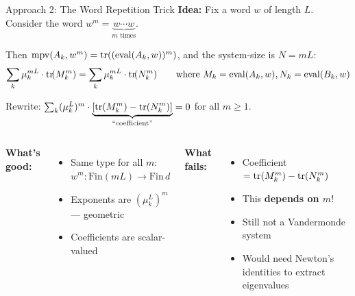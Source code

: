 \documentclass[aspectratio=169,10pt]{beamer}
\begin{document}
\begin{frame}{Approach 2: The Word Repetition Trick}
\vspace{-0.3em}
{\small\textbf{Idea:} Fix a word $w$ of length $L$. Consider the word $w^m = \underbrace{w \cdots w}_{m\text{ times}}$.}

\vspace{0.1em}
{\small Then $\mathrm{mpv}(A_k, w^m) = \mathrm{tr}((\mathrm{eval}(A_k, w))^m)$, and the system-size is $N = mL$:}
\[
\sum_k \mu_k^{mL} \cdot \mathrm{tr}\!(M_k^m) = \sum_k \mu_k^{mL} \cdot \mathrm{tr}\!(N_k^m)
\qquad \text{where } M_k = \mathrm{eval}(A_k, w),  N_k = \mathrm{eval}(B_k, w)
\]

\vspace{0.2em}
{\small Rewrite: $\sum_k (\mu_k^L)^m \cdot \underbrace{[\mathrm{tr}(M_k^m) - \mathrm{tr}(N_k^m)]}_{\text{``coefficient''}} = 0$ for all $m \geq 1$.}

\vspace{0.4em}
\begin{columns}[T]
{\small\textbf{\textcolor{leangreen}{What's good:}}}
\begin{itemize}
  \item Same type for all $m$: $w^m : \mathrm{Fin}(mL) \to \mathrm{Fin}\,d$
  \item Exponents are $(\mu_k^L)^m$ --- geometric
  \item Coefficients are scalar-valued
\end{itemize}

{\small\textbf{\textcolor{softred}{What fails:}}}
\begin{itemize}
  \item Coefficient $= \mathrm{tr}(M_k^m) - \mathrm{tr}(N_k^m)$
  \item This \textbf{depends on $m$}!
  \item Still not a Vandermonde system
  \item Would need Newton's identities to extract eigenvalues
\end{itemize}
\end{columns}

\vspace{0.3em}
\end{frame}
\end{document}
